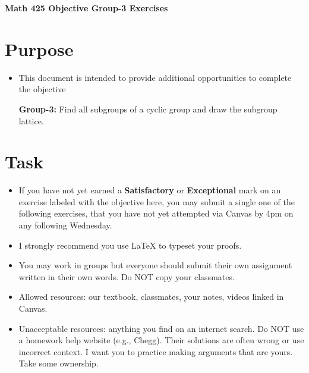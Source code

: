 \documentclass[12pt]{article}
\begin{document}
	\begin{center}
		{\Large \bf Math 425 Objective Group-3 Exercises}
	\end{center}
	\section*{Purpose}
	\begin{itemize}
		\item This document is intended to provide additional opportunities to complete the objective
		
		\textbf{Group-3:}  Find all subgroups of a cyclic group and draw the subgroup lattice.
	\end{itemize}
	\section*{Task}
	\begin{itemize}
		\item If you have not yet earned a \textbf{Satisfactory} or \textbf{Exceptional} mark on an exercise labeled with the objective here, you may submit a single one of the following exercises, that you have not yet attempted via Canvas by 4pm on any following Wednesday.
		\item I strongly recommend you use LaTeX to typeset your proofs.
		\item You may work in groups but everyone should submit their own assignment written in their own words.  Do NOT copy your classmates.
		\item Allowed resources: our textbook, classmates, your notes, videos linked in Canvas.
		\item Unacceptable resources: anything you find on an internet search. Do NOT use a homework help website (e.g., Chegg). Their solutions are often wrong or use incorrect context.  I want you to practice making arguments that are yours. Take some ownership.
	\end{itemize}
\end{document}
